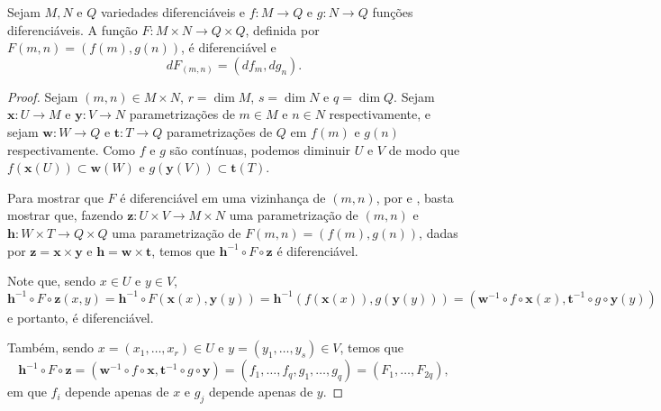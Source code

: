 	\begin{lemma}
		\label{lem:derivadas-produto-1}
		Sejam $M, N$ e $Q$ variedades diferenciáveis e $f:M\to Q$ e $g:N\to Q$ funções diferenciáveis. A função $F:M\times N\to Q\times Q$, definida por $F(m,n)=(f(m),g(n))$, é diferenciável e
		\begin{equation*}
			dF_{(m,n)}=(df_{m},dg_{n}).
		\end{equation*}
		\begin{proof}

			Sejam $(m,n)\in M\times N$, $r=\dim M$, $s=\dim N$ e $q=\dim Q$. Sejam $\mathbf{x}:U\to M$ e $\mathbf{y}:V\to N$ parametrizações de $m\in M$ e $n\in N$ respectivamente, e sejam $\mathbf{w}:W\to Q$ e $\mathbf{t}:T\to Q$ parametrizações de $Q$ em $f(m)$ e $g(n)$ respectivamente. Como $f$ e $g$ são contínuas, podemos diminuir $U$ e $V$ de modo que $f(\mathbf{x}(U))\subset \mathbf{w}(W)$ e $g(\mathbf{y}(V))\subset \mathbf{t}(T)$.

			Para mostrar que $F$ é diferenciável em uma vizinhança de $(m,n)$, por  e , basta mostrar que, fazendo $\mathbf{z}:U\times V\to M\times N$ uma parametrização de $(m,n)$ e $\mathbf{h}:W\times T\to Q\times Q$ uma parametrização de $F(m,n)=(f(m),g(n))$, dadas por $\mathbf{z}=\mathbf{x}\times\mathbf{y}$ e $\mathbf{h}=\mathbf{w}\times\mathbf{t}$, temos que $\mathbf{h}^{-1} \circ F \circ \mathbf{z}$ é diferenciável.

			Note que, sendo $x \in U$ e $y \in V$,
			\begin{equation*}
				\mathbf{h}^{-1} \circ F \circ \mathbf{z}(x,y)=\mathbf{h}^{-1} \circ F(\mathbf{x}(x),\mathbf{y}(y)) = \mathbf{h}^{-1}(f(\mathbf{x}(x)),g(\mathbf{y}(y))) = (\mathbf{w}^{-1}\circ f \circ \mathbf{x}(x), \mathbf{t}^{-1} \circ g \circ \mathbf{y}(y))
			\end{equation*}
			e portanto, é diferenciável.

			Também, sendo $x=(x_{1},\dots,x_{r}) \in U$ e $y=(y_{1}, \dots, y_{s})\in V$, temos que
			\begin{equation*}
				\mathbf{h}^{-1} \circ F\circ \mathbf{z}=(\mathbf{w}^{-1}\circ f\circ \mathbf{x}, \mathbf{t}^{-1} \circ g\circ \mathbf{y})=(f_{1}, \dots, f_{q}, g_{1}, \dots, g_{q})=(F_{1}, \dots, F_{2q}),
			\end{equation*}
			em que $f_{i}$ depende apenas de $x$ e $g_{j}$ depende apenas de $y$.


\end{proof}
\end{lemma}
